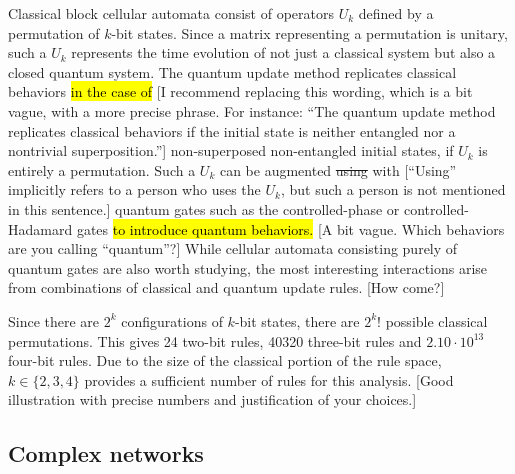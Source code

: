 \documentclass[11pt]{article}
\newcommand{\nicole}[1]{{\color{Green}#1}}
\begin{document}
\begin{multicols}{2}
Classical block cellular automata consist of operators $U_k$ defined by a permutation of $k$-bit states. Since a matrix representing a permutation is unitary, such a $U_k$ represents the time evolution of not just a classical system but also a closed quantum system. The quantum update method replicates classical behaviors \hl{in the case of} \nicole{[I recommend replacing this wording, which is a bit vague, with a more precise phrase. For instance: ``The quantum update method replicates classical behaviors if the initial state is neither entangled nor a nontrivial superposition.'']} non-superposed non-entangled initial states\nicole{,} if $U_k$ is entirely a permutation. Such a $U_k$ can be augmented \sout{using} \nicole{with [``Using'' implicitly refers to a person who uses the $U_k$, but such a person is not mentioned in this sentence.]} quantum gates such as the controlled-phase or controlled-Hadamard gates \hl{to introduce quantum behaviors.} \nicole{[A bit vague. Which behaviors are you calling ``quantum''?]} 
While cellular automata consisting purely of quantum gates are also worth studying, the most interesting interactions arise from combinations of classical and quantum update rules. \nicole{[How come?]}

Since there are $2^k$ configurations of $k$-bit states, there are $2^k!$ possible classical permutations. This gives 24 two-bit rules, 40320 three-bit rules and $2.10\cdot10^{13}$ four-bit rules. Due to the size of the classical portion of the rule space, $k\in \{2,3,4\}$ provides a sufficient number of rules for this analysis. 
\nicole{[Good illustration with precise numbers and justification of your choices.]}


\subsection*{Complex networks}


\end{multicols}
\end{document}
